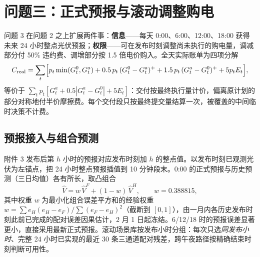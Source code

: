 \section{问题三：正式预报与滚动调整购电}
问题 3 在问题 2 之上扩展两件事：\textbf{信息}——每天 0:00、6:00、12:00、18:00 获得未来 24 小时整点光伏预报；\textbf{权限}——可在发布时刻调整尚未执行的购电量，调减部分付 50\% 违约费、调增部分按 1.5 倍电价购入。全天实际账单为四项分解
\begin{equation}
C_{\mathrm{real}}=\sum_t\Bigl[p_t\min(G^0_t,G^a_t)+0.5\,p_t\,(G^0_t-G^a_t)^+
+1.5\,p_t\,(G^a_t-G^0_t)^++5p_tE_t\Bigr],
\label{eq:q3bill}
\end{equation}
等价于 $\sum_tp_t[G^a_t+0.5|G^a_t-G^0_t|+5E_t]$：交付按最终执行量计价，偏离原计划的部分对称地付半价摩擦费。每个交付段只按最终提交量结算一次，被覆盖的中间临时决策不计费。

\subsection{预报接入与组合预测}
附件 3 发布后第 $h$ 小时的预报对应发布时刻加 $h$ 的整点值。以发布时刻已观测光伏为左锚点，把 24 小时整点预报插值到 10 分钟段末。0:00 的正式预报与历史预测（三日均值）各有所长，取凸组合
\begin{equation}
\widehat{V}=w\,\widehat{V}^{F}+(1-w)\,\widehat{V}^{H},\qquad w=0.388815,
\label{eq:q3combine}
\end{equation}
其中权重 $w$ 为最小化组合误差平方和的经验权重 $w=\sum e_H(e_H-e_F)/\sum(e_F-e_H)^2$（截断到 $[0,1]$），由一月内各历史发布时刻此前已完成的配对误差因果估计，2 月 1 日起冻结。6/12/18 时的预报误差显著更小，直接采用最新正式预报。滚动场景库按发布小时分组：每次只选\emph{同发布小时}、完整 24 小时已实现的最近 30 条三通道配对残差，跨午夜路径按精确结束时刻判断可用性。

